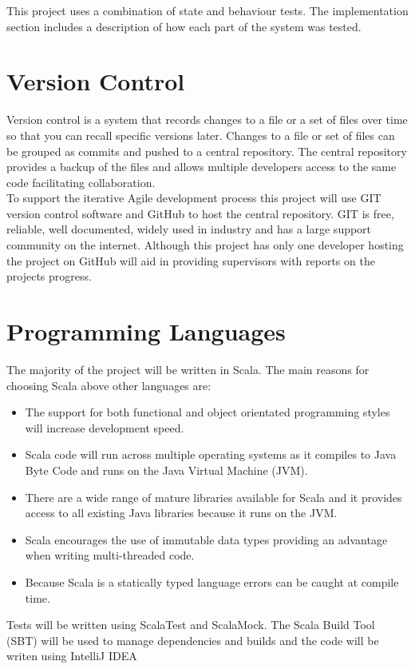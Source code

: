 		This project uses a combination of state and behaviour tests. The implementation section includes a description of how each part of the system was tested.
			
	\section{Version Control}
	Version control is a system that records changes to a file or a set of files over time so that you can recall specific versions later\cite{GitGettingStarted}. Changes to a file or set of files can be grouped as commits and pushed to a central repository. The central repository provides a backup of the files and allows multiple developers access to the same code facilitating collaboration.\\
	
	To support the iterative Agile development process this project will use GIT\cite{GIT} version control software and GitHub to host the central repository. GIT is free, reliable, well documented, widely used in industry and has a large support community on the internet.	 Although this project has only one developer hosting the project on GitHub will aid in providing supervisors with reports on the projects progress.
				
	\section{Programming Languages}
		The majority of the project will be written in Scala\cite{Scala}. The main reasons for choosing Scala above other languages are:
		
		\begin{itemize}
			\item The support for both functional and object orientated programming styles will increase development speed.
			\item Scala code will run across multiple operating systems as it compiles to Java Byte Code and runs on the Java Virtual Machine (JVM).
			\item There are a wide range of mature libraries available for Scala and it provides access to all existing Java libraries because it runs on the JVM.
			\item Scala encourages the use of immutable data types providing an advantage when writing multi-threaded code.
			\item Because Scala is a statically typed language errors can be caught at compile time.
		\end{itemize}

	Tests will be written using ScalaTest and ScalaMock. The Scala Build Tool (SBT) will be used to manage dependencies and builds and the code will be writen using IntelliJ IDEA \cite{Intellij}